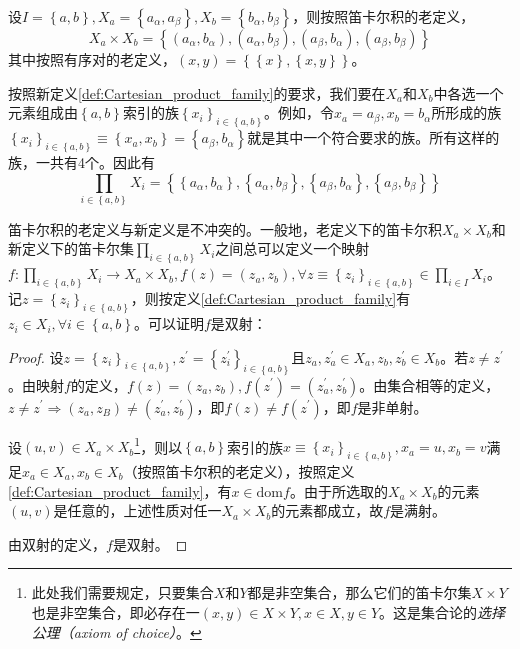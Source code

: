\documentclass[../main.tex]{subfiles}
\begin{document}
\begin{example}
    设$I=\left\{a,b\right\},X_a=\left\{a_\alpha,a_\beta\right\},X_b=\left\{b_\alpha,b_\beta\right\}$，则按照笛卡尔积的老定义，
    \[
        X_a\times X_b=\left\{\left(a_\alpha,b_\alpha\right),\left(a_\alpha,b_\beta\right),\left(a_\beta,b_\alpha\right),\left(a_\beta,b_\beta\right)\right\}
    \]
    其中按照有序对的老定义，$\left(x,y\right)=\left\{\left\{x\right\},\left\{x,y\right\}\right\}$。

    按照新定义\ref{def:Cartesian_product_family}的要求，我们要在$X_a$和$X_b$中各选一个元素组成由$\left\{a,b\right\}$索引的族$\left\{x_i\right\}_{i\in\left\{a,b\right\}}$。例如，令$x_a=a_\beta,x_b=b_\alpha$所形成的族$\left\{x_i\right\}_{i\in\left\{a,b\right\}}\equiv\left\{x_a,x_b\right\}=\left\{a_\beta,b_\alpha\right\}$就是其中一个符合要求的族。所有这样的族，一共有4个。因此有
    \[
        \prod_{i\in\left\{a,b\right\}}X_i=\left\{\left\{a_\alpha,b_\alpha\right\},\left\{a_\alpha,b_\beta\right\},\left\{a_\beta,b_\alpha\right\},\left\{a_\beta,b_\beta\right\}\right\}
    \]
\end{example}


笛卡尔积的老定义与新定义是不冲突的。一般地，老定义下的笛卡尔积$X_a\times X_b$和新定义下的笛卡尔集$\prod_{i\in\left\{a,b\right\}}X_i$之间总可以定义一个映射$f:\prod_{i\in\left\{a,b\right\}}X_i\rightarrow X_a\times X_b,f\left(z\right)=\left(z_a,z_b\right),\forall z\equiv\left\{z_i\right\}_{i\in\left\{a,b\right\}}\in\prod_{i\in I}X_i$。记$z=\left\{z_i\right\}_{i\in\left\{a,b\right\}}$，则按定义\ref{def:Cartesian_product_family}有$z_i\in X_i,\forall i\in\left\{a,b\right\}$。可以证明$f$是双射：
\begin{proof}
    设$z=\left\{z_i\right\}_{i\in\left\{a,b\right\}},z^\prime=\left\{z^\prime_i\right\}_{i\in\left\{a,b\right\}}$且$z_a,z^\prime_a\in X_a,z_b,z^\prime_b\in X_b$。若$z\neq z^\prime$。由映射$f$的定义，$f\left(z\right)=\left(z_a,z_b\right),f\left(z^\prime\right)=\left(z^\prime_a,z^\prime_b\right)$。由集合相等的定义，$z\neq z^\prime\Rightarrow\left(z_a,z_B\right)\neq\left(z^\prime_a,z^\prime_b\right)$，即$f\left(z\right)\neq f\left(z^\prime\right)$，即$f$是非单射。

    设$\left(u,v\right)\in X_a\times X_b$\footnote{此处我们需要规定，只要集合$X$和$Y$都是非空集合，那么它们的笛卡尔集$X\times Y$也是非空集合，即必存在一$\left(x,y\right)\in X\times Y,x\in X,y\in Y$。这是集合论的\emph{选择公理（axiom of choice）}。}，则以$\left\{a,b\right\}$索引的族$x\equiv\left\{x_i\right\}_{i\in\left\{a,b\right\}},x_a=u,x_b=v$满足$x_a\in X_a,x_b\in X_b$（按照笛卡尔积的老定义），按照定义\ref{def:Cartesian_product_family}，有$x\in\mathrm{dom}f$。由于所选取的$X_a\times X_b$的元素$\left(u,v\right)$是任意的，上述性质对任一$X_a\times X_b$的元素都成立，故$f$是满射。

    由双射的定义，$f$是双射。
\end{proof}
\end{document}
